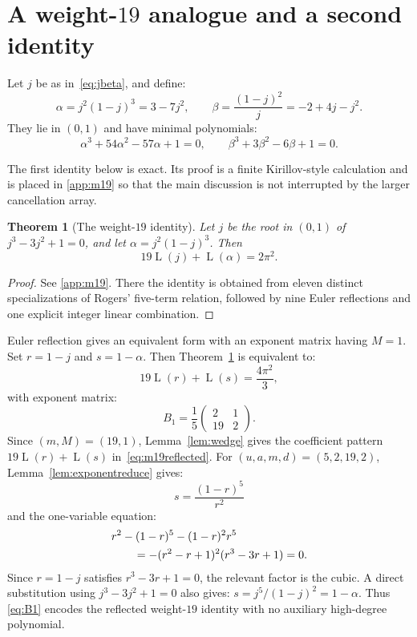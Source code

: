 \documentclass[preprint,12pt,number]{elsarticle}
\newtheorem{theorem}{Theorem}
\theoremstyle{remark}
\newcommand{\Lr}{\operatorname{L}}
\begin{document}
\section{A weight-\texorpdfstring{$19$}{19} analogue and a second identity}
\label{sec:further}

\noindent Let $j$ be as in~\eqref{eq:jbeta}, and define:
\begin{equation}\label{eq:alphabeta}
\alpha=j^2(1-j)^3=3-7j^2,
\qquad
\beta=\frac{(1-j)^2}{j}=-2+4j-j^2.
\end{equation}
They lie in $(0,1)$ and have minimal polynomials:
\begin{equation}\label{eq:alphabetaminpoly}
\alpha^3+54\alpha^2-57\alpha+1=0,
\qquad
\beta^3+3\beta^2-6\beta+1=0.
\end{equation}

The first identity below is exact.  Its proof is a
finite Kirillov-style calculation and is placed in \ref{app:m19}
so that the main discussion is not interrupted by the larger cancellation
array.

\begin{theorem}[The weight-$19$ identity]\label{thm:m19}
Let $j$ be the root in $(0,1)$ of $j^3-3j^2+1=0$, and let
$\alpha=j^2(1-j)^3$.  Then
\begin{equation}\label{eq:m19identity}
19\Lr(j)+\Lr(\alpha)=2\pi^2.
\end{equation}
\end{theorem}

\begin{proof}
See \ref{app:m19}.  There the identity is obtained from eleven
distinct specializations of Rogers' five-term relation, followed by nine
Euler reflections and one explicit integer linear combination.
\end{proof}

\noindent Euler reflection gives an equivalent form with an exponent matrix having
$M=1$.  Set $r=1-j$ and $s=1-\alpha$.  Then Theorem~\ref{thm:m19}
is equivalent to:
\begin{equation}\label{eq:m19reflected}
19\Lr(r)+\Lr(s)=\frac{4\pi^2}{3},
\end{equation}
with exponent matrix:
\begin{equation}\label{eq:B1}
B_1=\frac15\begin{pmatrix}2&1\\19&2\end{pmatrix}.
\end{equation}
Since $(m,M)=(19,1)$, Lemma~\ref{lem:wedge} gives the coefficient pattern
$19\Lr(r)+\Lr(s)$ in~\eqref{eq:m19reflected}.  For
$(u,a,m,d)=(5,2,19,2)$, Lemma~\ref{lem:exponentreduce} gives:
\[
s=\frac{(1-r)^5}{r^2}
\]
and the one-variable equation:
\begin{align}
&r^2-(1-r)^5-(1-r)^2r^5 \notag\\
&\qquad=-(r^2-r+1)^2(r^3-3r+1)=0.\label{eq:m19cleanfactor}
\end{align}
Since $r=1-j$ satisfies $r^3-3r+1=0$, the relevant factor is the cubic.
A direct substitution using $j^3-3j^2+1=0$ also gives:
$s=j^5/(1-j)^2=1-\alpha$.  Thus
\eqref{eq:B1} encodes the reflected weight-$19$ identity with no auxiliary
high-degree polynomial.
\end{document}
